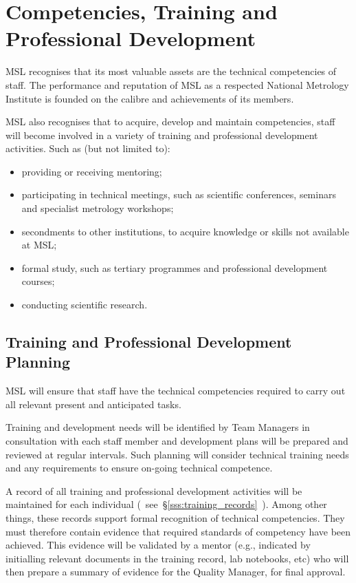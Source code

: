 \section{Competencies, Training and Professional Development}
\label{s:competencies_professional_development}
MSL recognises that its most valuable assets are the technical competencies of staff.  The performance and reputation of MSL as a respected National Metrology Institute is founded on the calibre and achievements of its members. 

MSL also recognises that to acquire, develop and maintain competencies, staff will become involved in a variety of training and professional development activities. Such as (but not limited to):
\begin{itemize}
\item providing or receiving mentoring;
\item participating in technical meetings, such as scientific conferences, seminars and specialist metrology workshops;
\item secondments to other institutions, to acquire knowledge or skills not available at MSL;
\item formal study, such as tertiary programmes and professional development courses;
\item conducting scientific research.
\end{itemize}
\subsection{Training and Professional Development Planning}
MSL will ensure that staff have the technical competencies required to carry out all relevant present and anticipated tasks. 

Training and development needs will be identified by Team Managers in consultation with each staff member and development plans will be prepared and reviewed at regular intervals. Such planning will consider technical training needs and any requirements to ensure on-going technical competence. 

A record of all training and professional development activities will be maintained for each individual (~see~\S\ref{sss:training_records}~). Among other things, these records support formal recognition of technical competencies. They must therefore contain evidence that required standards of competency have been achieved. This evidence will be validated by a mentor (e.g., indicated by initialling relevant documents in the training record, lab notebooks, etc) who will then prepare a summary of evidence for the Quality Manager, for final approval.

